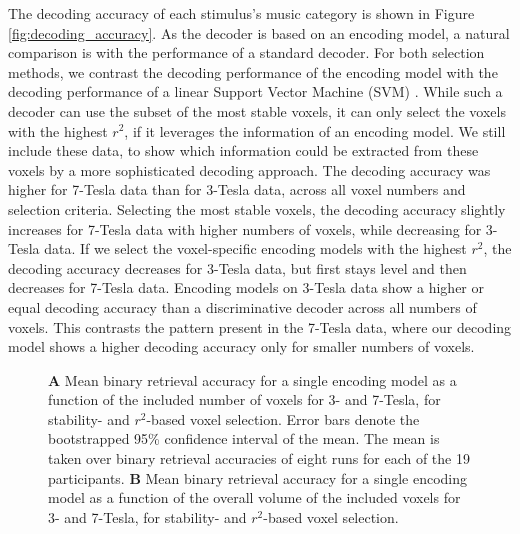 The decoding accuracy of each stimulus's music category is shown in Figure
\ref{fig:decoding_accuracy}. As the decoder is based on an encoding model, a
natural comparison is with the performance of a standard decoder. For both
selection methods, we contrast the decoding performance of the encoding model
with the decoding performance of a linear Support Vector Machine (SVM)
\citep{FCH+08,V13}. While such a decoder can use the subset of the most stable
voxels, it can only select the voxels with the highest $r^2$, if it leverages
the information of an encoding model. We still include these data, to show
which information could be extracted from these voxels by a more sophisticated
decoding approach.  The decoding accuracy was higher for 7-Tesla data than for
3-Tesla data, across all voxel numbers and selection criteria.  Selecting the
most stable voxels, the decoding accuracy slightly increases for 7-Tesla data
with higher numbers of voxels, while decreasing for 3-Tesla data.  If we select
the voxel-specific encoding models with the highest $r^2$, the decoding
accuracy decreases for 3-Tesla data, but first stays level and then decreases
for 7-Tesla data. Encoding models on 3-Tesla data show a higher or equal
decoding accuracy than a discriminative decoder across all numbers of voxels.
This contrasts the pattern present in the 7-Tesla data, where our decoding
model shows a higher decoding accuracy only for smaller numbers of voxels.

\begin{figure}
  \centering
  \def\svgwidth{\linewidth}
  
	
  \caption{\textbf{A} Mean binary retrieval accuracy for a single encoding
  model as a function of the included number of voxels for 3- and 7-Tesla, for
  stability- and $r^2$-based voxel selection. Error bars denote the
  bootstrapped 95\% confidence interval of the mean. The mean is taken over
  binary retrieval accuracies of eight runs for each of the 19 participants.
  \textbf{B} Mean binary retrieval accuracy for a single encoding model as a
  function of the overall volume of the included voxels for 3- and 7-Tesla, for
stability- and $r^2$-based voxel selection.
}

\label{fig:binary_retrieval_mve}
\end{figure}

